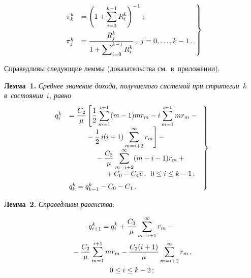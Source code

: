 \begin{multicols}{2}
   \vspace*{-12pt}
   
   \noindent
   \begin{equation}
   \left.
   \begin{array}{rl}
   \pi_k^k &=\displaystyle \left( 1+\sum\limits_{i=0}^{k-1} R_i^k\right)^{-1}\,;\\[14pt]
    \pi_j^k &= \displaystyle\displaystyle\frac{\displaystyle R_j^k\mathstrut}{\displaystyle 1+\sum\nolimits_{i=0}^{k-1} R_i^k\mathstrut}\,,\
 j=0,\ldots , k-1\,.
 \end{array}
 \right\}
   \label{e7-aga}
   \end{equation}
  
  Справедливы следующие леммы (доказательства см.\ в~приложении).
  
  \smallskip
  
  \noindent
  \textbf{Лемма~1.} \textit{Среднее значение дохода, получаемого сис\-те\-мой 
при стратегии~$k$ в~состоянии~$i$, равно}
  \begin{equation}
  \left.
  \begin{array}{rl}
  \hspace*{-2mm}q_i^k &=\displaystyle\fr{C_2}{\mu}\left[ \fr{1}{2}\sum\limits_{m=1}^{i+1} (m-1) mr_m - i 
\sum\limits_{m=1}^{i+1} mr_m -{}\right.\\[6pt]
&\displaystyle\left.\hspace*{8mm}{}-\fr{1}{2}\,i(i+1) \sum\limits^\infty_{m=i+2} 
r_m\right]- {}\\[6pt]
&\hspace*{13mm}{}-\displaystyle\fr{C_3}{\mu} \sum\limits^\infty_{m=i+2} (m-i-1)r_m +{}\\
&\hspace*{18mm}{}+C_0 -
C_4\overline{v}\,,\enskip 0\leq i\leq k-1\,;
\\[6pt]
&  q_k^k=q_{k-1}^k -C_0-C_1\,.
 \end{array}
 \right\}
   \label{e8-aga}
   \end{equation}
   
  
  \noindent
  \textbf{Лемма~2.} \textit{Справедливы равенства}:
  
  \noindent
  \begin{multline}
  q^k_{i+1} =q_i^k +\displaystyle\frac{\displaystyle C_3\mathstrut}{\displaystyle \mu\mathstrut}\sum\limits^\infty_{m=i+1} r_m -{}\\
  {}-
\displaystyle\frac{\displaystyle C_2\mathstrut}{\displaystyle \mu\mathstrut} \sum\limits_{m=1}^{i+1} mr_m -\displaystyle\frac{\displaystyle C_2(i+1)\mathstrut}{\displaystyle \mu\mathstrut} 
\sum\limits_{m=i+2}^\infty r_m\,,\\
  0\leq i\leq k-2\,;
  \label{e9-aga}
  \end{multline}
  

\end{multicols}

